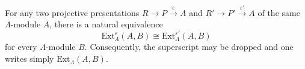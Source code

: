 For any two projective presentations $R \to P \xrightarrow{\varepsilon} A$ and $R' \to P' \xrightarrow{\varepsilon'} A$ of the same $\Lambda$-module $A$, there is a natural equivalence
$$\text{Ext}_\Lambda^\varepsilon(A, B) \cong \text{Ext}_\Lambda^{\varepsilon'}(A, B)$$
for every $\Lambda$-module $B$. Consequently, the superscript may be dropped and one writes simply $\text{Ext}_\Lambda(A, B)$.
